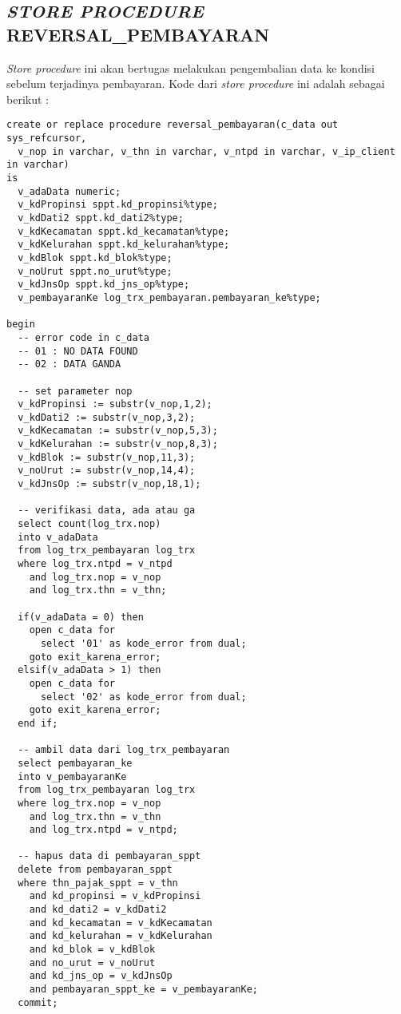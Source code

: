 \documentclass[pdftex,12pt, oneside]{article}
\begin{document}
\subsection{\textit{STORE PROCEDURE} REVERSAL\_PEMBAYARAN}

\textit{Store procedure} ini akan bertugas melakukan pengembalian data ke kondisi sebelum terjadinya pembayaran. Kode dari \textit{store procedure} ini adalah sebagai berikut :

\begin{lstlisting}
create or replace procedure reversal_pembayaran(c_data out sys_refcursor,
  v_nop in varchar, v_thn in varchar, v_ntpd in varchar, v_ip_client in varchar)
is
  v_adaData numeric;
  v_kdPropinsi sppt.kd_propinsi%type;
  v_kdDati2 sppt.kd_dati2%type;
  v_kdKecamatan sppt.kd_kecamatan%type;
  v_kdKelurahan sppt.kd_kelurahan%type;
  v_kdBlok sppt.kd_blok%type;
  v_noUrut sppt.no_urut%type;
  v_kdJnsOp sppt.kd_jns_op%type;
  v_pembayaranKe log_trx_pembayaran.pembayaran_ke%type;

begin
  -- error code in c_data
  -- 01 : NO DATA FOUND
  -- 02 : DATA GANDA

  -- set parameter nop
  v_kdPropinsi := substr(v_nop,1,2);
  v_kdDati2 := substr(v_nop,3,2);
  v_kdKecamatan := substr(v_nop,5,3);
  v_kdKelurahan := substr(v_nop,8,3);
  v_kdBlok := substr(v_nop,11,3);
  v_noUrut := substr(v_nop,14,4);
  v_kdJnsOp := substr(v_nop,18,1);

  -- verifikasi data, ada atau ga
  select count(log_trx.nop)
  into v_adaData
  from log_trx_pembayaran log_trx
  where log_trx.ntpd = v_ntpd
    and log_trx.nop = v_nop
    and log_trx.thn = v_thn;

  if(v_adaData = 0) then
    open c_data for
      select '01' as kode_error from dual;
    goto exit_karena_error;
  elsif(v_adaData > 1) then
    open c_data for
      select '02' as kode_error from dual;
    goto exit_karena_error;
  end if;

  -- ambil data dari log_trx_pembayaran
  select pembayaran_ke
  into v_pembayaranKe
  from log_trx_pembayaran log_trx
  where log_trx.nop = v_nop
    and log_trx.thn = v_thn
    and log_trx.ntpd = v_ntpd;

  -- hapus data di pembayaran_sppt
  delete from pembayaran_sppt
  where thn_pajak_sppt = v_thn
    and kd_propinsi = v_kdPropinsi
    and kd_dati2 = v_kdDati2
    and kd_kecamatan = v_kdKecamatan
    and kd_kelurahan = v_kdKelurahan
    and kd_blok = v_kdBlok
    and no_urut = v_noUrut
    and kd_jns_op = v_kdJnsOp
    and pembayaran_sppt_ke = v_pembayaranKe;
  commit;


\end{lstlisting}
\end{document}
